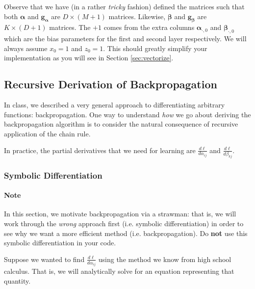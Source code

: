\documentclass[11pt]{exam}
\numberwithin{equation}{section} %
\numberwithin{figure}{section} %
\numberwithin{table}{section} %
\newcommand{\adj}[1]{\frac{d \ell}{d #1}}
\newcommand{\gv}{\mathbf{g}}
\newcommand{\alphav     }{\boldsymbol \alpha     }
\newcommand{\betav      }{\boldsymbol \beta      }
\begin{document}
Observe that we have (in a rather \emph{tricky} fashion) defined the matrices such that both $\alphav$ and $\gv_{\alphav}$ are $D \times (M+1)$ matrices. Likewise, $\betav$ and $\gv_{\betav}$ are $K \times (D+1)$ matrices. The $+1$ comes from the extra columns $\alphav_{\cdot, 0}$ and $\betav_{\cdot, 0}$ which are the bias parameters for the first and second layer respectively. We will always assume $x_0 = 1$ and $z_0 = 1$. This should greatly simplify your implementation as you will see in Section \ref{sec:vectorize}.


\subsection{Recursive Derivation of Backpropagation}
\label{sec:recursive}

In class, we described a very general approach to differentiating arbitrary functions: backpropagation. One way to understand \emph{how} we go about deriving the backpropagation algorithm is to consider the natural consequence of recursive application of the chain rule. 

In practice, the partial derivatives that we need for learning are $\adj{\alpha_{ij}}$ and $\adj{\beta_{kj}}$.

\subsubsection{Symbolic Differentiation}

\begin{notebox}
\paragraph{Note} In this section, we motivate backpropagation via a strawman: that is, we will work through the \emph{wrong} approach first (i.e. symbolic differentiation) in order to see why we want a more efficient method (i.e. backpropagation). Do {\bf not} use this symbolic differentiation in your code.
\end{notebox}

Suppose we wanted to find $\adj{\alpha_{ij}}$ using the method we know from high school calculus. That is, we will analytically solve for an equation representing that quantity.
\end{document}
